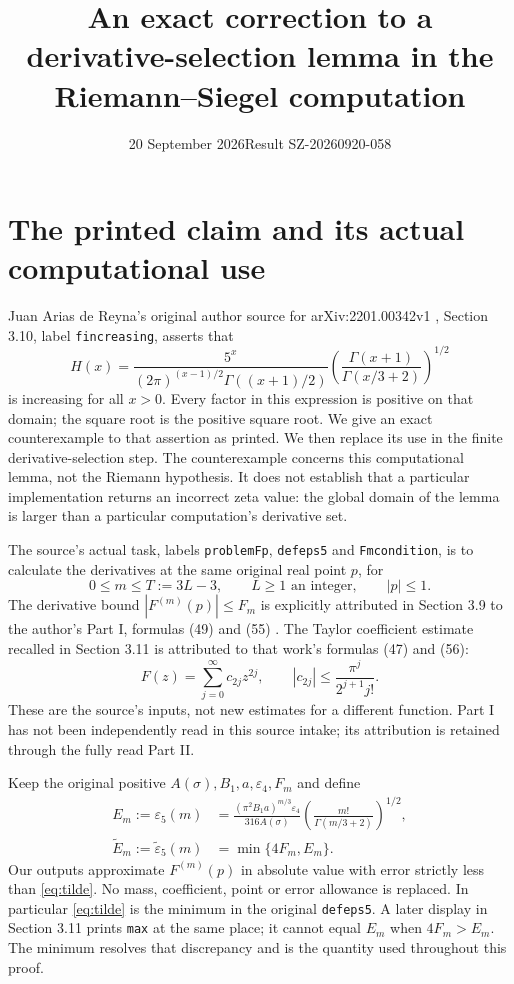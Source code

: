 \documentclass[11pt]{article}
\title{An exact correction to a derivative-selection lemma\newline
in the Riemann--Siegel computation}
\author{}
\date{20 September 2026\quad Result SZ-20260920-058}
\newcommand{\eps}{\varepsilon}
\begin{document}
\maketitle

\section{The printed claim and its actual computational use}
\label{sec:source}
Juan Arias de Reyna's original author source for
arXiv:2201.00342v1 \cite{AriasII}, Section 3.10, label
\texttt{fincreasing}, asserts that
\begin{equation}\label{eq:H}
H(x)=\frac{5^x}{(2\pi)^{(x-1)/2}\Gamma((x+1)/2)}
\left(\frac{\Gamma(x+1)}{\Gamma(x/3+2)}\right)^{1/2}
\end{equation}
is increasing for all $x>0$. Every factor in this expression is
positive on that domain; the square root is the positive square root.
We give an exact counterexample to that assertion as printed.
We then replace its use in the finite derivative-selection step.
The counterexample concerns this computational lemma, not the
Riemann hypothesis. It does not establish that a particular
implementation returns an incorrect zeta value: the global domain
of the lemma is larger than a particular computation's derivative set.

The source's actual task, labels \texttt{problemFp},
\texttt{defeps5} and \texttt{Fmcondition}, is to calculate the
derivatives at the same original real point $p$, for
\begin{equation}\label{eq:indices}
0\le m\le T:=3L-3,\qquad L\ge1\text{ an integer},\qquad |p|\le1.
\end{equation}
The derivative bound $|F^{(m)}(p)|\le F_m$ is explicitly attributed
in Section 3.9 to the author's Part I, formulas (49) and (55)
\cite{AriasI}. The Taylor coefficient estimate recalled in Section
3.11 is attributed to that work's formulas (47) and (56):
\begin{equation}\label{eq:Fclass}
F(z)=\sum_{j=0}^{\infty}c_{2j}z^{2j},\qquad
|c_{2j}|\le\frac{\pi^j}{2^{j+1}j!}.
\end{equation}
These are the source's inputs, not new estimates for a different
function. Part I has not been independently read in this source
intake; its attribution is retained through the fully read Part II.

Keep the original positive $A(\sigma),B_1,a,\eps_4,F_m$ and define
\begin{align}
E_m:=\eps_5(m)
&=\frac{(\pi^2B_1a)^{m/3}\eps_4}{316A(\sigma)}
\left(\frac{m!}{\Gamma(m/3+2)}\right)^{1/2},\label{eq:eps5}\\
\widetilde E_m:=\widetilde\eps_5(m)
&=\min\{4F_m,E_m\}.\label{eq:tilde}
\end{align}
Our outputs approximate $F^{(m)}(p)$ in absolute value with error
strictly less than \eqref{eq:tilde}. No mass, coefficient, point
or error allowance is replaced. In particular \eqref{eq:tilde}
is the minimum in the original \texttt{defeps5}. A later display
in Section 3.11 prints \texttt{max} at the same place; it cannot
equal $E_m$ when $4F_m>E_m$. The minimum resolves that discrepancy
and is the quantity used throughout this proof.
\end{document}
